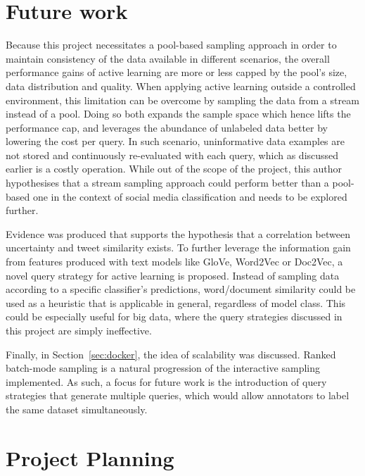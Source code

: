 \documentclass[a4paper,12pt]{article}
\begin{document}
\section{Future work}
Because this project necessitates a pool-based sampling approach in order to maintain consistency of the data available in different scenarios, the overall performance gains of active learning are more or less capped by the pool's size, data distribution and quality. When applying active learning outside a controlled environment, this limitation can be overcome by sampling the data from a stream instead of a pool. Doing so both expands the sample space which hence lifts the performance cap, and leverages the abundance of unlabeled data better by lowering the cost per query. In such scenario, uninformative data examples are not stored and continuously re-evaluated with each query, which as discussed earlier is a costly operation. While out of the scope of the project, this author hypothesises that a stream sampling approach could perform better than a pool-based one in the context of social media classification and needs to be explored further.

Evidence was produced that supports the hypothesis that a correlation between uncertainty and tweet similarity exists. To further leverage the information gain from features produced with text models like GloVe, Word2Vec or Doc2Vec, a novel query strategy for active learning is proposed. Instead of sampling data according to a specific classifier's predictions, word/document similarity could be used as a heuristic that is applicable in general, regardless of model class. This could be especially useful for big data, where the query strategies discussed in this project are simply ineffective.

Finally, in Section~\ref{sec:docker}, the idea of scalability was discussed. Ranked batch-mode sampling is a natural progression of the interactive sampling implemented. As such, a focus for future work is the introduction of query strategies that generate multiple queries, which would allow annotators to label the same dataset simultaneously.
\newpage
\section{Project Planning}
\end{document}
